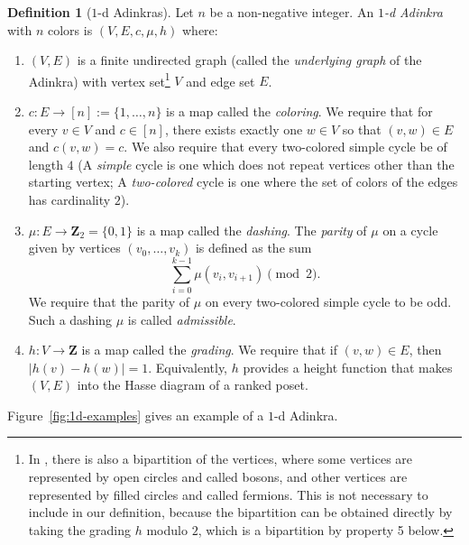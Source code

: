 \documentclass[12pt,twoside,singlespace]{article}
\numberwithin{equation}{section}
\theoremstyle{definition}
\newtheorem{definition}[equation]{Definition}
\newcommand{\ZZ}{\mathbf{Z}}
\begin{document}
\begin{definition}[$1$-d Adinkras]
Let $n$ be a non-negative integer.  An \emph{$1$-d Adinkra} with $n$ colors is $(V,E,c,\mu,h)$ where: 

\begin{enumerate}
\item $(V,E)$ is a finite undirected graph (called the \emph{underlying graph} of the Adinkra) with vertex set\footnote{In \cite{d2l:first,d2l:graph-theoretic}, there is also a bipartition of the vertices, where some vertices are represented by open circles and called bosons, and other vertices are represented by filled circles and called fermions.  This is not necessary to include in our definition, because the bipartition can be obtained directly by taking the grading $h$ modulo $2$, which is a bipartition by property 5 below.} $V$ and edge set $E$.
\item $c:E\to [n] := \{1,\ldots,n\}$ is a map called the \emph{coloring}. We require that for every $v\in V$ and $c \in [n]$, there exists exactly one $w\in V$ so that $(v,w)\in E$ and $c(v,w)=c$. We also require that every two-colored simple cycle be of length $4$ (A \emph{simple} cycle is one which does not repeat vertices other than the starting vertex; A \emph{two-colored} cycle is one where the set of colors of the edges has cardinality $2$).
\item $\mu:E\to \ZZ_2=\{0,1\}$ is a map called the \emph{dashing}.  The \emph{parity} of $\mu$ on a cycle given by vertices $(v_0,\ldots,v_k)$ is defined as the sum
\[\sum_{i=0}^{k-1}\mu(v_i,v_{i+1})\pmod{2}.\]
We require that the parity of $\mu$ on every two-colored simple cycle to be odd. Such a dashing $\mu$ is called \emph{admissible}.
\item $h:V\to\ZZ$ is a map called the \emph{grading}. We require that if $(v,w)\in E$, then $|h(v)-h(w)|=1$. Equivalently, $h$ provides a height function that makes $(V,E)$ into the Hasse diagram of a ranked poset.
\end{enumerate}

Figure~\ref{fig:1d-examples} gives an example of a $1$-d Adinkra.
\end{definition}
\end{document}
